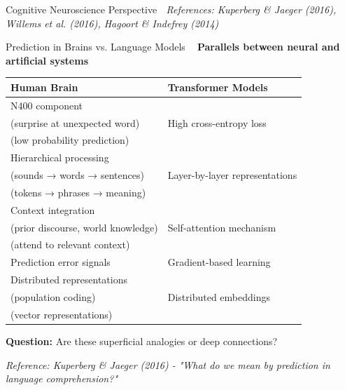 \documentclass[aspectratio=169]{beamer}
\begin{document}
\begin{frame}[shrink=10]{Cognitive Neuroscience Perspective 🧠}
\vspace{0.5em}
\small
\textit{References: Kuperberg \& Jaeger (2016), Willems et al. (2016), Hagoort \& Indefrey (2014)}
\end{frame}

\begin{frame}{Prediction in Brains vs. Language Models 🧠🤖}
\textbf{Parallels between neural and artificial systems}

\vspace{1em}

\begin{center}
\begin{tabular}{p{5cm}p{5cm}}
\toprule
\textbf{Human Brain} & \textbf{Transformer Models} \\
\midrule
N400 component\\
(surprise at unexpected word) &
High cross-entropy loss\\
(low probability prediction) \\
\midrule
Hierarchical processing\\
(sounds → words → sentences) &
Layer-by-layer representations\\
(tokens → phrases → meaning) \\
\midrule
Context integration\\
(prior discourse, world knowledge) &
Self-attention mechanism\\
(attend to relevant context) \\
\midrule
Prediction error signals &
Gradient-based learning \\
\midrule
Distributed representations\\
(population coding) &
Distributed embeddings\\
(vector representations) \\
\bottomrule
\end{tabular}
\end{center}

\vspace{1em}

\textbf{Question:} Are these superficial analogies or deep connections?

\small
\textit{Reference: Kuperberg \& Jaeger (2016) - "What do we mean by prediction in language comprehension?"}
\end{frame}
\end{document}

